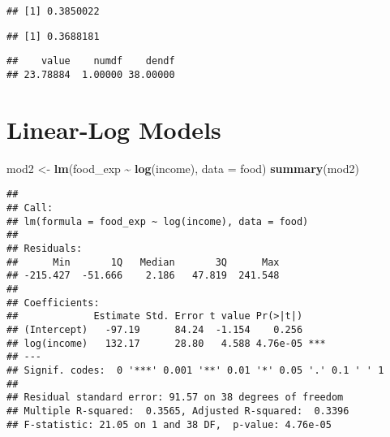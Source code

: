 \documentclass[
]{book}
\newenvironment{Shaded}{\begin{snugshade}}{\end{snugshade}}
\newcommand{\AttributeTok}[1]{\textcolor[rgb]{0.13,0.29,0.53}{#1}}
\newcommand{\FunctionTok}[1]{\textcolor[rgb]{0.13,0.29,0.53}{\textbf{#1}}}
\newcommand{\NormalTok}[1]{#1}
\newcommand{\OtherTok}[1]{\textcolor[rgb]{0.56,0.35,0.01}{#1}}
\newcommand{\SpecialCharTok}[1]{\textcolor[rgb]{0.81,0.36,0.00}{\textbf{#1}}}
\begin{document}
\begin{Shaded}
\end{Shaded}

\begin{verbatim}
## [1] 0.3850022
\end{verbatim}

\begin{Shaded}
\end{Shaded}

\begin{verbatim}
## [1] 0.3688181
\end{verbatim}

\begin{Shaded}
\end{Shaded}

\begin{verbatim}
##    value    numdf    dendf 
## 23.78884  1.00000 38.00000
\end{verbatim}

\hypertarget{linear-log-models}{%
\section{Linear-Log Models}\label{linear-log-models}}

\begin{Shaded}
\begin{Highlighting}[]
\NormalTok{mod2 }\OtherTok{\textless{}{-}} \FunctionTok{lm}\NormalTok{(food\_exp }\SpecialCharTok{\textasciitilde{}} \FunctionTok{log}\NormalTok{(income), }\AttributeTok{data =}\NormalTok{ food)}
\FunctionTok{summary}\NormalTok{(mod2)}
\end{Highlighting}
\end{Shaded}

\begin{verbatim}
## 
## Call:
## lm(formula = food_exp ~ log(income), data = food)
## 
## Residuals:
##      Min       1Q   Median       3Q      Max 
## -215.427  -51.666    2.186   47.819  241.548 
## 
## Coefficients:
##             Estimate Std. Error t value Pr(>|t|)    
## (Intercept)   -97.19      84.24  -1.154    0.256    
## log(income)   132.17      28.80   4.588 4.76e-05 ***
## ---
## Signif. codes:  0 '***' 0.001 '**' 0.01 '*' 0.05 '.' 0.1 ' ' 1
## 
## Residual standard error: 91.57 on 38 degrees of freedom
## Multiple R-squared:  0.3565, Adjusted R-squared:  0.3396 
## F-statistic: 21.05 on 1 and 38 DF,  p-value: 4.76e-05
\end{verbatim}
\end{document}

